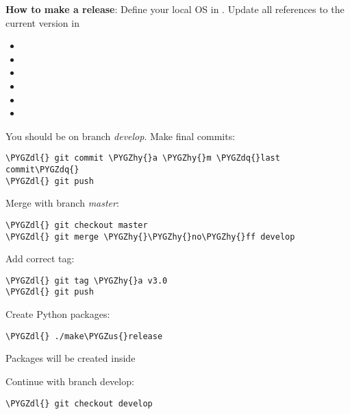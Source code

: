 \documentclass[letterpaper,10pt,english]{sphinxmanual}
\def\PYGZus{\char`\_}
\def\PYGZdl{\char`\$}
\def\PYGZhy{\char`\-}
\def\PYGZdq{\char`\"}
\begin{document}
\textbf{How to make a release}:
Define your local OS in .
Update all references to the current version in
\begin{itemize}
\item {} 

\item {} 

\item {} 

\item {} 

\item {} 

\item {} 

\end{itemize}

You should be on branch \emph{develop}.
Make final commits:

\begin{Verbatim}[commandchars=\\\{\}]
\PYGZdl{} git commit \PYGZhy{}a \PYGZhy{}m \PYGZdq{}last commit\PYGZdq{}
\PYGZdl{} git push
\end{Verbatim}

Merge with branch \emph{master}:

\begin{Verbatim}[commandchars=\\\{\}]
\PYGZdl{} git checkout master
\PYGZdl{} git merge \PYGZhy{}\PYGZhy{}no\PYGZhy{}ff develop
\end{Verbatim}

Add correct tag:

\begin{Verbatim}[commandchars=\\\{\}]
\PYGZdl{} git tag \PYGZhy{}a v3.0
\PYGZdl{} git push
\end{Verbatim}

Create Python packages:

\begin{Verbatim}[commandchars=\\\{\}]
\PYGZdl{} ./make\PYGZus{}release
\end{Verbatim}

Packages will be created inside 

Continue with branch develop:

\begin{Verbatim}[commandchars=\\\{\}]
\PYGZdl{} git checkout develop
\end{Verbatim}



\renewcommand{\indexname}{Index}
\printindex
\end{document}
